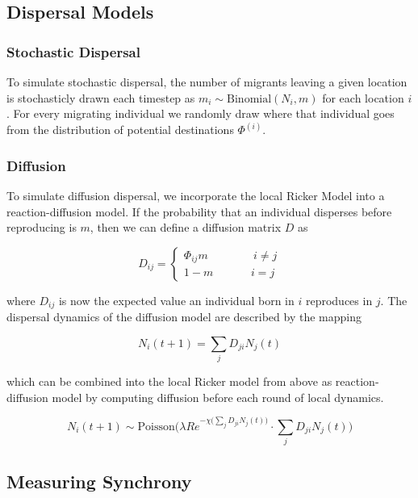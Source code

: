 \documentclass[10pt,oneside]{article}
\begin{document}
\hypertarget{dispersal-models}{%
\subsection{Dispersal Models}\label{dispersal-models}}

\hypertarget{stochastic-dispersal}{%
\subsubsection{Stochastic Dispersal}\label{stochastic-dispersal}}

To simulate stochastic dispersal, the number of migrants leaving a given
location is stochasticly drawn each timestep as
\(m_{i} \sim \text{Binomial}(N_i, m)\) for each location \(i\). For
every migrating individual we randomly draw where that individual goes
from the distribution of potential destinations \(\Phi^{(i)}\).

\hypertarget{diffusion}{%
\subsubsection{Diffusion}\label{diffusion}}

To simulate diffusion dispersal, we incorporate the local Ricker Model
into a reaction-diffusion model. If the probability that an individual
disperses before reproducing is \(m\), then we can define a diffusion
matrix \(D\) as

\[D_{ij} = \begin{cases} \Phi_{ij}m \quad\quad\quad &\ i \neq j \\ 1-m
& i=j \end{cases}\]

where \(D_{ij}\) is now the expected value an individual born in \(i\)
reproduces in \(j\). The dispersal dynamics of the diffusion model are
described by the mapping

\[N_i(t+1) = \sum_j D_{ji} N_j(t)\]

which can be combined into the local Ricker model from above as
reaction-diffusion model by computing diffusion before each round of
local dynamics.

\[N_i(t+1) \sim \text{Poisson}\bigg( \lambda R e^{-\chi \big(\sum_j
D_{ji} N_j(t)\big)} \cdot \sum_j D_{ji} N_j(t) \bigg)\]

\hypertarget{measuring-synchrony}{%
\subsection{Measuring Synchrony}\label{measuring-synchrony}}
\end{document}
